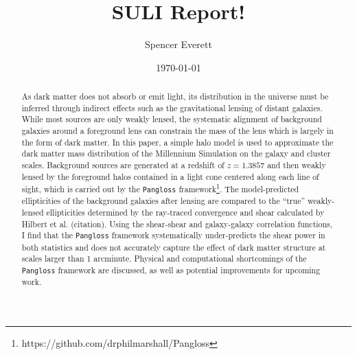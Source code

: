 \documentclass[%
 reprint,
 amsmath,amssymb,
 aps,
]{revtex4-1}
\begin{document}

\title{SULI Report!}

\author{Spencer Everett}


\date{\today}

\begin{abstract}
As dark matter does not absorb or emit light, its distribution in the universe must be inferred through indirect effects such as the gravitational lensing of distant galaxies. While most sources are only weakly lensed, the systematic alignment of background galaxies around a foreground lens can constrain the mass of the lens which is largely in the form of dark matter. In this paper, a simple halo model is used to approximate the dark matter mass distribution of the Millennium Simulation on the galaxy and cluster scales. Background sources are generated at a redshift of ${z = 1.3857}$ and then weakly lensed by the foreground halos contained in a light cone centered along each line of sight, which is carried out by the \texttt{Pangloss} framework\footnote{https://github.com/drphilmarshall/Pangloss}. The model-predicted ellipticities of the background galaxies after lensing are compared to the ``true'' weakly-lensed ellipticities determined by the ray-traced convergence and shear calculated by Hilbert et al. (citation). Using the shear-shear and galaxy-galaxy correlation functions, I find that the \texttt{Pangloss} framework systematically under-predicts the shear power in both statistics and does not accurately capture the effect of dark matter structure at scales larger than 1 arcminute. Physical and computational shortcomings of the \texttt{Pangloss} framework are discussed, as well as potential improvements for upcoming work.
\end{abstract}

\maketitle
\end{document}
